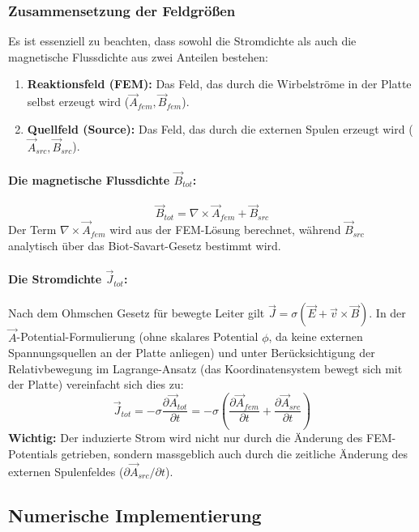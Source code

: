 \documentclass[a4paper,12pt]{article}
\begin{document}
\subsubsection{Zusammensetzung der Feldgrößen}
Es ist essenziell zu beachten, dass sowohl die Stromdichte als auch die magnetische Flussdichte aus zwei Anteilen bestehen:
\begin{enumerate}
    \item \textbf{Reaktionsfeld (FEM):} Das Feld, das durch die Wirbelströme in der Platte selbst erzeugt wird ($\vec{A}_{fem}, \vec{B}_{fem}$).
    \item \textbf{Quellfeld (Source):} Das Feld, das durch die externen Spulen erzeugt wird ($\vec{A}_{src}, \vec{B}_{src}$).
\end{enumerate}

\paragraph{Die magnetische Flussdichte $\vec{B}_{tot}$:}
\begin{equation}
    \vec{B}_{tot} = \nabla \times \vec{A}_{fem} + \vec{B}_{src}
\end{equation}
Der Term $\nabla \times \vec{A}_{fem}$ wird aus der FEM-Lösung berechnet, während $\vec{B}_{src}$ analytisch über das Biot-Savart-Gesetz bestimmt wird.

\paragraph{Die Stromdichte $\vec{J}_{tot}$:}
Nach dem Ohmschen Gesetz für bewegte Leiter gilt $\vec{J} = \sigma (\vec{E} + \vec{v} \times \vec{B})$. In der $\vec{A}$-Potential-Formulierung (ohne skalares Potential $\phi$, da keine externen Spannungsquellen an der Platte anliegen) und unter Berücksichtigung der Relativbewegung im Lagrange-Ansatz (das Koordinatensystem bewegt sich mit der Platte) vereinfacht sich dies zu:
\begin{equation}
    \vec{J}_{tot} = -\sigma \frac{\partial \vec{A}_{tot}}{\partial t} = -\sigma \left( \frac{\partial \vec{A}_{fem}}{\partial t} + \frac{\partial \vec{A}_{src}}{\partial t} \right)
    \label{eq:j_tot}
\end{equation}
\textbf{Wichtig:} Der induzierte Strom wird nicht nur durch die Änderung des FEM-Potentials getrieben, sondern massgeblich auch durch die zeitliche Änderung des externen Spulenfeldes ($\partial \vec{A}_{src} / \partial t$).

\subsection{Numerische Implementierung}
\end{document}
